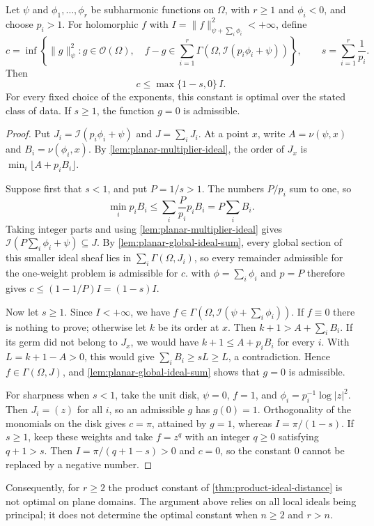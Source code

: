\begin{theorem}\label{thm:planar-optimal-ideal-distance}
Let $\psi$ and $\phi_1,\ldots,\phi_r$ be subharmonic functions on $\Omega$, with $r\geq1$ and $\phi_i<0$, and choose $p_i>1$. For holomorphic $f$ with $I=\|f\|_{\psi+\sum_i\phi_i}^2<+\infty$, define
\[
 c=\inf\left\{\|g\|_\psi^2:g\in\mathcal O(\Omega),\quad
 f-g\in\sum_{i=1}^r\Gamma(\Omega,\mathcal I(p_i\phi_i+\psi))\right\},
 \qquad s=\sum_{i=1}^r\frac1{p_i}.
\]
Then
\begin{equation}\label{eq:planar-optimal-ideal-distance}
 c\leq\max\{1-s,0\}\,I.
\end{equation}
For every fixed choice of the exponents, this constant is optimal over the stated class of data. If $s\geq1$, the function $g=0$ is admissible.
\end{theorem}
\begin{proof}
Put $J_i=\mathcal I(p_i\phi_i+\psi)$ and $J=\sum_iJ_i$. At a point $x$, write $A=\nu(\psi,x)$ and $B_i=\nu(\phi_i,x)$. By \cref{lem:planar-multiplier-ideal}, the order of $J_x$ is $\min_i\lfloor A+p_iB_i\rfloor$.

Suppose first that $s<1$, and put $P=1/s>1$. The numbers $P/p_i$ sum to one, so
\[
 \min_i p_iB_i\leq\sum_i\frac{P}{p_i}p_iB_i=P\sum_iB_i.
\]
Taking integer parts and using \cref{lem:planar-multiplier-ideal} gives $\mathcal I(P\sum_i\phi_i+\psi)\subseteq J$. By \cref{lem:planar-global-ideal-sum}, every global section of this smaller ideal sheaf lies in $\sum_i\Gamma(\Omega,J_i)$, so every remainder admissible for the one-weight problem is admissible for $c$.  with $\phi=\sum_i\phi_i$ and $p=P$ therefore gives $c\leq(1-1/P)I=(1-s)I$.

Now let $s\geq1$. Since $I<+\infty$, we have $f\in\Gamma(\Omega,\mathcal I(\psi+\sum_i\phi_i))$. If $f\equiv0$ there is nothing to prove; otherwise let $k$ be its order at $x$. Then $k+1>A+\sum_iB_i$. If its germ did not belong to $J_x$, we would have $k+1\leq A+p_iB_i$ for every $i$. With $L=k+1-A>0$, this would give $\sum_iB_i\geq sL\geq L$, a contradiction. Hence $f\in\Gamma(\Omega,J)$, and \cref{lem:planar-global-ideal-sum} shows that $g=0$ is admissible.

For sharpness when $s<1$, take the unit disk, $\psi=0$, $f=1$, and $\phi_i=p_i^{-1}\log|z|^2$. Then $J_i=(z)$ for all $i$, so an admissible $g$ has $g(0)=1$. Orthogonality of the monomials on the disk gives $c=\pi$, attained by $g=1$, whereas $I=\pi/(1-s)$. If $s\geq1$, keep these weights and take $f=z^q$ with an integer $q\geq0$ satisfying $q+1>s$. Then $I=\pi/(q+1-s)>0$ and $c=0$, so the constant $0$ cannot be replaced by a negative number.
\end{proof}

Consequently, for $r\geq2$ the product constant of \cref{thm:product-ideal-distance} is not optimal on plane domains. The argument above relies on all local ideals being principal; it does not determine the optimal constant when $n\geq2$ and $r>n$.
